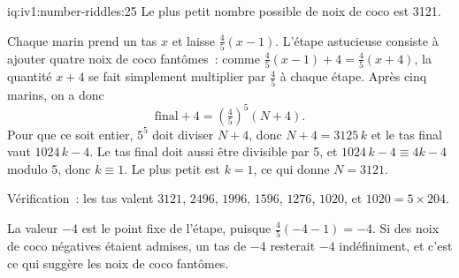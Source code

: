 \begin{solution}{iq:iv1:number-riddles:25}
Le plus petit nombre possible de noix de coco est 3121.

Chaque marin prend un tas $x$ et laisse $\tfrac45(x - 1)$. L'étape astucieuse consiste à ajouter quatre noix de coco fantômes~: comme $\tfrac45(x - 1) + 4 = \tfrac45(x + 4)$, la quantité $x + 4$ se fait simplement multiplier par $\tfrac45$ à chaque étape. Après cinq marins, on a donc
\[
\text{final} + 4 = \left(\tfrac45\right)^5 (N + 4).
\]
Pour que ce soit entier, $5^5$ doit diviser $N + 4$, donc $N + 4 = 3125\,k$ et le tas final vaut $1024\,k - 4$. Le tas final doit aussi être divisible par 5, et $1024\,k - 4 \equiv 4k - 4$ modulo 5, donc $k \equiv 1$. Le plus petit est $k = 1$, ce qui donne $N = 3121$.

Vérification~: les tas valent $3121$, $2496$, $1996$, $1596$, $1276$, $1020$, et $1020 = 5 \times 204$.

La valeur $-4$ est le point fixe de l'étape, puisque $\tfrac45(-4 - 1) = -4$. Si des noix de coco négatives étaient admises, un tas de $-4$ resterait $-4$ indéfiniment, et c'est ce qui suggère les noix de coco fantômes.

\end{solution}
